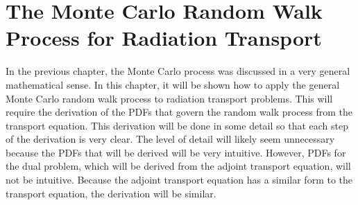 \chapter{The Monte Carlo Random Walk Process for Radiation Transport}
\label{ch:particle_transport}
In the previous chapter, the Monte Carlo process was discussed in a very
general mathematical sense. In this chapter, it will be shown how to apply
the general Monte Carlo random walk process to radiation transport 
problems. This will require the derivation of the PDFs that govern the random 
walk process from the transport equation. This derivation will be done in
some detail so that each step of the derivation is very clear. The level of
detail will likely seem unnecessary because the PDFs that will be derived
will be very intuitive. However, PDFs for the dual problem, which will be
derived from the adjoint transport equation, will not be intuitive. 
Because the adjoint transport equation has a similar form to the
transport equation, the derivation will be similar. 

